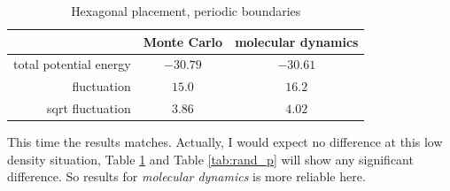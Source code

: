 \documentclass[UTF8,a4paper]{article}
\begin{document}
\begin{table}[H]
	\centering
	\caption{Hexagonal placement, periodic boundaries}
	\begin{tabular}{rcc}
		\toprule
		\toprule
		                       & Monte Carlo & molecular dynamics \\ \midrule
		total potential energy & $-30.79$    & $-30.61$           \\
		fluctuation            & $15.0$      & $16.2$             \\
		sqrt fluctuation       & $3.86$      & $4.02$             \\
		\bottomrule
	\end{tabular}%
	\label{tab:hex_md_1}%
\end{table}%
This time the results matches. Actually, I would expect no difference at this low density situation, Table \ref{tab:hex_md_1} and Table \ref{tab:rand_p} will show any significant difference. 
So results for \textit{molecular dynamics} is more reliable here.
\end{document}
